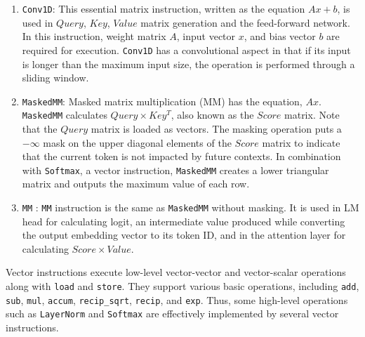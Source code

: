 \begin{enumerate} [leftmargin=*]
\setlength\itemsep{0.01in}
    \item \texttt{Conv1D}: This essential matrix instruction, written as the equation $Ax + b$, is used in $Query$, $Key$, $Value$ matrix generation and the feed-forward network. In this instruction, weight matrix $A$, input vector $x$, and bias vector $b$ are required for execution. \texttt{Conv1D} has a convolutional aspect in that if its input is longer than the maximum input size, the operation is performed through a sliding window.
    \item \texttt{MaskedMM}: Masked matrix multiplication (MM) has the equation, $Ax$. \texttt{MaskedMM} calculates $Query \times Key^T$, also known as the $Score$ matrix. Note that the $Query$ matrix is loaded as vectors. The masking operation puts a $-\infty$ mask on the upper diagonal elements of the $Score$ matrix to indicate that the current token is not impacted by future contexts. In combination with \texttt{Softmax}, a vector instruction, \texttt{MaskedMM} creates a lower triangular matrix and outputs the maximum value of each row.
    \item \texttt{MM} : \texttt{MM} instruction is the same as \texttt{MaskedMM} without masking. It is used in LM head for calculating logit, an intermediate value produced while converting the output embedding vector to its token ID, and in the attention layer for calculating $Score \times Value$. 
\end{enumerate}

Vector instructions execute low-level vector-vector and vector-scalar operations along with \texttt{load} and \texttt{store}. They support various basic operations, including \texttt{add}, \texttt{sub}, \texttt{mul}, \texttt{accum}, \texttt{recip\_sqrt}, \texttt{recip}, and \texttt{exp}. Thus, some high-level operations such as \texttt{LayerNorm} and \texttt{Softmax} are effectively implemented by several vector instructions.


